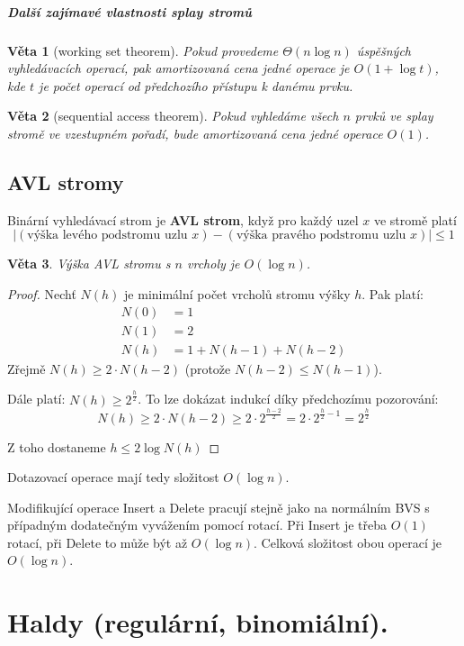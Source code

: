 \documentclass[11pt]{report} %
\newtheorem{theorem}{Věta}[section]
\numberwithin{equation}{section}
\begin{document}
\subparagraph{Další zajímavé vlastnosti splay stromů}
\begin{theorem}[working set theorem]
Pokud provedeme $\Theta(n\log n)$ úspěšných vyhledávacích operací, pak amortizovaná cena jedné operace je $O(1+\log t)$, kde $t$ je počet operací od předchozího přístupu k danému prvku.
\end{theorem}
\begin{theorem}[sequential access theorem]
Pokud vyhledáme všech $n$ prvků ve splay stromě ve vzestupném pořadí, bude amortizovaná cena jedné operace $O(1)$.
\end{theorem}


\subsection{AVL stromy}
Binární vyhledávací strom je \textbf{AVL strom}, když pro každý uzel $x$ ve stromě platí 
$$|(\text{výška levého podstromu uzlu $x$}) - (\text{výška pravého podstromu uzlu $x$})| \leq 1$$

\begin{theorem}
Výška AVL stromu s $n$ vrcholy je $O(\log n)$.
\end{theorem}
\begin{proof}
Nechť $N(h)$ je minimální počet vrcholů stromu výšky $h$. Pak platí:
\begin{align*}
	N(0) &= 1 \\
	N(1) &= 2 \\
	N(h) &= 1 + N(h - 1) + N(h - 2)
\end{align*}
Zřejmě $N(h) \geq 2\cdot N(h-2)$ (protože $N(h-2) \leq N(h-1)$). 

Dále platí: $N(h) \geq 2^{\frac{h}{2}}$. To lze dokázat indukcí díky předchozímu pozorování:
$$N(h) \geq 2\cdot N(h-2) \geq 2\cdot 2^{\frac{h-2}{2}} = 2\cdot 2^{\frac{h}{2} - 1} = 2^\frac{h}{2}$$

Z toho dostaneme $h \leq 2 \log N(h)$
\end{proof}

Dotazovací operace mají tedy složitost $O(\log n)$.

Modifikující operace Insert a Delete pracují stejně jako na normálním BVS s případným dodatečným vyvážením pomocí rotací. Při Insert je třeba $O(1)$ rotací, při Delete to může být až $O(\log n)$. Celková složitost obou operací je $O(\log n)$.

\section{Haldy (regulární, binomiální).}
\end{document}
